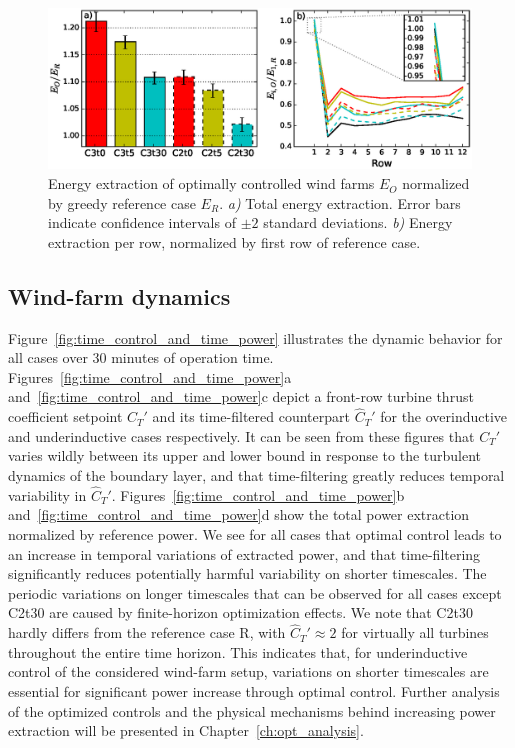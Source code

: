 \begin{figure}
	\centering
	\includegraphics[width=\linewidth]{chapters/philtrans_torque/figure8.eps}
	\caption{Energy extraction of optimally controlled wind farms $E_O$ normalized by greedy reference case $E_R$. \emph{a) } Total energy extraction. Error bars indicate confidence intervals of $\pm 2$ standard deviations. \emph{b) } Energy extraction per row, normalized by first row of reference case. \legend \label{fig:bar_and_row}}
\end{figure}

\subsection{Wind-farm dynamics}\label{sec:opt_ind_dyn}
Figure~\ref{fig:time_control_and_time_power} illustrates the dynamic behavior for all cases over 30 minutes of operation time. Figures~\ref{fig:time_control_and_time_power}a and~\ref{fig:time_control_and_time_power}c depict a front-row turbine thrust coefficient setpoint $C_T'$ and its time-filtered counterpart $\widehat{C}_T'$ for the overinductive and underinductive cases respectively. It can be seen from these figures that $C_T'$ varies wildly between its upper and lower bound in response to the turbulent dynamics of the boundary layer, and that time-filtering greatly reduces temporal variability in $\widehat{C}_T'$. Figures~\ref{fig:time_control_and_time_power}b and~\ref{fig:time_control_and_time_power}d show the total power extraction normalized by reference power. We see for all cases that optimal control leads to an increase in temporal variations of extracted power, and that time-filtering significantly reduces potentially harmful variability on shorter timescales. The periodic variations on longer timescales that can be observed for all cases except C2t30 are caused by finite-horizon optimization effects.
We note that C2t30 hardly differs from the reference case R, with $\widehat{C}_T' \approx 2$ for virtually all turbines throughout the entire time horizon. This indicates that, for underinductive control of the considered wind-farm setup, variations on shorter timescales are essential for significant power increase through optimal control. Further analysis of the optimized controls and the physical mechanisms behind increasing power extraction will be presented in Chapter~\ref{ch:opt_analysis}. 


